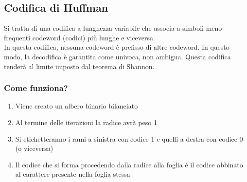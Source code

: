 \documentclass{report}
\begin{document}
	\subsection{Codifica di Huffman}
	Si tratta di una codifica a lunghezza variabile che associa a simboli meno frequenti codeword (codici) più lunghe e viceversa.\\
	In questa codifica, nessuna codeword è prefisso di altre codeword. In questo modo, la decodifica è garantita come univoca, non ambigua.
	Questa codifica tenderà al limite imposto dal teorema di Shannon.
	\subsubsection{Come funziona?}
	\begin{enumerate}
		\item Viene creato un albero binario bilanciato
		\item Al termine delle iterazioni la radice avrà peso 1
		\item Si etichetteranno i rami a sinistra con codice 1 e quelli a destra con codice 0 (o viceversa)
		\item Il codice che si forma procedendo dalla radice alla foglia è il codice abbinato al carattere presente nella foglia stessa
	\end{enumerate}
	
	\newpage
	
\end{document}
